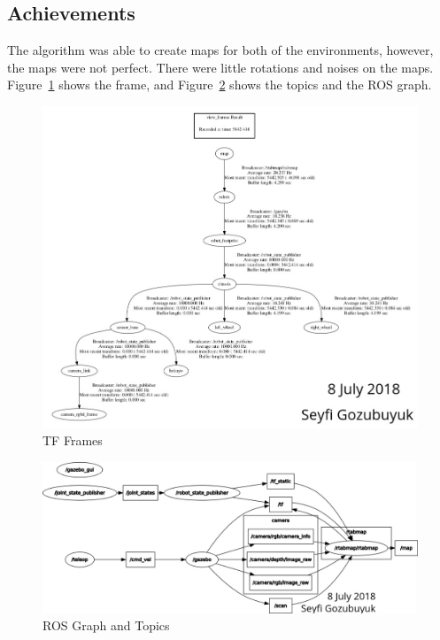 \documentclass[10pt,journal,compsoc]{IEEEtran}
\begin{document}
\subsection{Achievements}
The algorithm was able to create maps for both of the environments, however, the maps were not perfect. There were little rotations and noises on the maps. Figure~\ref{fig:tff} shows the frame, and Figure~\ref{fig:rqt} shows the topics and the ROS graph.

\begin{figure}[thpb]
      \centering
      \includegraphics[width=\linewidth]{figures/tf_frames.png}
      \caption{TF Frames}
      \label{fig:tff}
\end{figure}

\begin{figure}[thpb]
      \centering
      \includegraphics[width=\linewidth]{figures/rosgraph.png}
      \caption{ROS Graph and Topics}
      \label{fig:rqt}
\end{figure}
\end{document}
